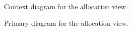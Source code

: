 \documentclass[english]{sareport}
\begin{document}
\begin{figure}[!htp]
	\centering
	\caption{Context diagram for the allocation view.}\label{fig:depl_context}
\end{figure}

\begin{figure}[!htp]
	\centering
	\caption{Primary diagram for the allocation view.}\label{fig:depl_main}
\end{figure}
\end{document}
